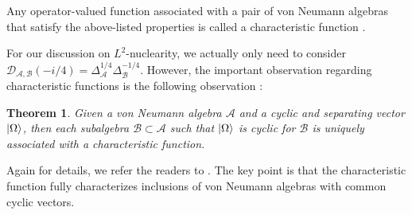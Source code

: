 \documentclass[a4paper,11pt]{article}
\newtheorem{theorem}{Theorem}
\theoremstyle{definition}
\begin{document}
Any operator-valued function associated with a pair of von Neumann algebras that satisfy the above-listed properties is called a characteristic function \cite{revolutionizing}.

For our discussion on $L^2$-nuclearity, we actually only need to consider $\mathcal{D}_{\mathcal{A},\mathcal{B}}(-i/4) = \Delta_\mathcal{A}^{1/4}\Delta_\mathcal{B}^{-1/4}$. However, the important observation regarding characteristic functions is the following observation \cite{revolutionizing}:
\begin{theorem}
    Given a von Neumann algebra $\mathcal{A}$ and a cyclic and separating vector $\ket{\Omega}$, then each subalgebra $\mathcal{B}\subset\mathcal{A}$ such that $\ket{\Omega}$ is cyclic for $\mathcal{B}$ is uniquely associated with a characteristic function.
\end{theorem}
Again for details, we refer the readers to \cite{revolutionizing}. The key point is that the characteristic function fully characterizes inclusions of von Neumann algebras with common cyclic vectors.
\end{document}
